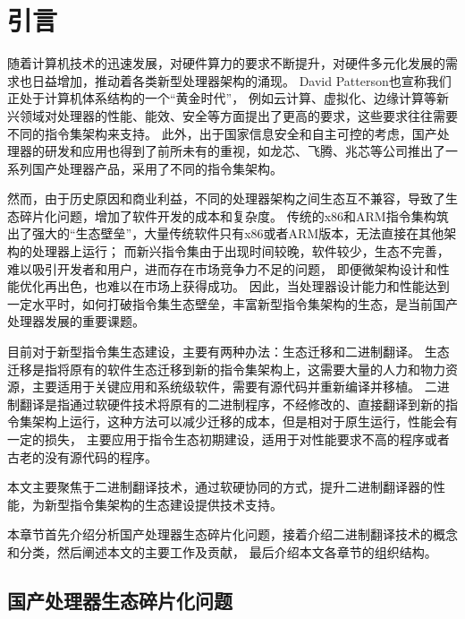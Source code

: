 \chapter{引言}\label{chap:introduction}


随着计算机技术的迅速发展，对硬件算力的要求不断提升，对硬件多元化发展的需求也日益增加，推动着各类新型处理器架构的涌现。
David Patterson也宣称我们正处于计算机体系结构的一个“黄金时代”\cite{goldenage}，
例如云计算、虚拟化、边缘计算等新兴领域对处理器的性能、能效、安全等方面提出了更高的要求，这些要求往往需要不同的指令集架构来支持。
此外，出于国家信息安全和自主可控的考虑，国产处理器的研发和应用也得到了前所未有的重视，如龙芯、飞腾、兆芯等公司推出了一系列国产处理器产品，采用了不同的指令集架构。

然而，由于历史原因和商业利益，不同的处理器架构之间生态互不兼容，导致了生态碎片化问题，增加了软件开发的成本和复杂度。
传统的x86和ARM指令集构筑出了强大的“生态壁垒”，大量传统软件只有x86或者ARM版本，无法直接在其他架构的处理器上运行；
而新兴指令集由于出现时间较晚，软件较少，生态不完善，难以吸引开发者和用户，进而存在市场竞争力不足的问题，
即便微架构设计和性能优化再出色，也难以在市场上获得成功。
因此，当处理器设计能力和性能达到一定水平时，如何打破指令集生态壁垒，丰富新型指令集架构的生态，是当前国产处理器发展的重要课题。

目前对于新型指令集生态建设，主要有两种办法：生态迁移和二进制翻译。
生态迁移是指将原有的软件生态迁移到新的指令集架构上，这需要大量的人力和物力资源，主要适用于关键应用和系统级软件，需要有源代码并重新编译并移植。
二进制翻译是指通过软硬件技术将原有的二进制程序，不经修改的、直接翻译到新的指令集架构上运行，这种方法可以减少迁移的成本，但是相对于原生运行，性能会有一定的损失，
主要应用于指令生态初期建设，适用于对性能要求不高的程序或者古老的没有源代码的程序。

本文主要聚焦于二进制翻译技术，通过软硬协同的方式，提升二进制翻译器的性能，为新型指令集架构的生态建设提供技术支持。

本章节首先介绍分析国产处理器生态碎片化问题，接着介绍二进制翻译技术的概念和分类，然后阐述本文的主要工作及贡献，
最后介绍本文各章节的组织结构。

\section{国产处理器生态碎片化问题}

